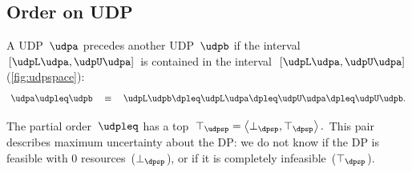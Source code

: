 \subsection{Order on UDP}
\begin{definition}
A UDP~$\udpa$ precedes another UDP~$\udpb$ if the interval~$[\udpL\udpa,\udpU\udpa]$
is contained in the interval~$[\udpL\udpa,\udpU\udpa]$ (\cref{fig:udpspace}):
\[
\udpa\udpleq\udpb\quad\equiv\quad\udpL\udpb\dpleq\udpL\udpa\dpleq\udpU\udpa\dpleq\udpU\udpb.
\]
\end{definition}

The partial order~$\udpleq$ has a top~$\top_{\udpsp}=\left\langle \bot_{\dpsp},\top_{\dpsp}\right\rangle .$
This pair describes maximum uncertainty about the DP: we do not know
if the DP is feasible with 0 resources~($\bot_{\dpsp}$), or if it
is completely infeasible~($\top_{\dpsp}$).


